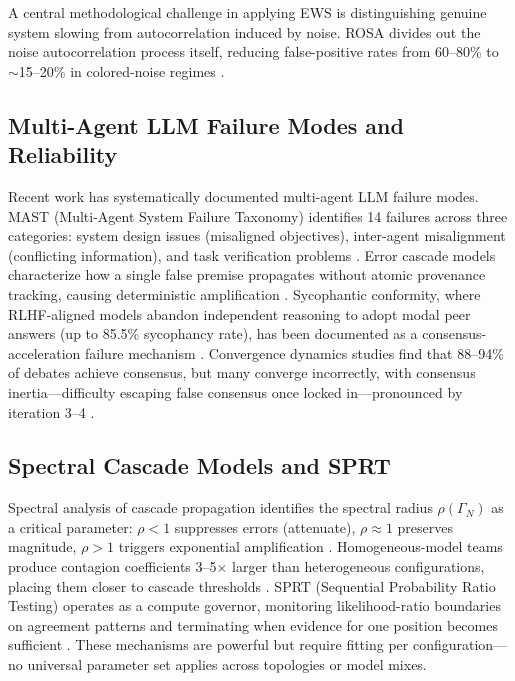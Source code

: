 \documentclass[11pt,letterpaper]{article}
\begin{document}
A central methodological challenge in applying EWS is distinguishing genuine system slowing from autocorrelation induced by noise. ROSA divides out the noise autocorrelation process itself, reducing false-positive rates from 60--80\% to $\sim$15--20\% in colored-noise regimes \citep{Clarke2023}.

\subsection{Multi-Agent LLM Failure Modes and Reliability}

Recent work has systematically documented multi-agent LLM failure modes. MAST (Multi-Agent System Failure Taxonomy) identifies 14 failures across three categories: system design issues (misaligned objectives), inter-agent misalignment (conflicting information), and task verification problems \citep{Cemri2025}. Error cascade models characterize how a single false premise propagates without atomic provenance tracking, causing deterministic amplification \citep{Xie2026}. Sycophantic conformity, where RLHF-aligned models abandon independent reasoning to adopt modal peer answers (up to 85.5\% sycophancy rate), has been documented as a consensus-acceleration failure mechanism \citep{Wynn2025}. Convergence dynamics studies find that 88--94\% of debates achieve consensus, but many converge incorrectly, with consensus inertia---difficulty escaping false consensus once locked in---pronounced by iteration 3--4 \citep{Wu2025,Marandi2026}.

\subsection{Spectral Cascade Models and SPRT}

Spectral analysis of cascade propagation identifies the spectral radius $\rho(\Gamma_N)$ as a critical parameter: $\rho < 1$ suppresses errors (attenuate), $\rho \approx 1$ preserves magnitude, $\rho > 1$ triggers exponential amplification \citep{Liu2026}. Homogeneous-model teams produce contagion coefficients 3--5$\times$ larger than heterogeneous configurations, placing them closer to cascade thresholds \citep{Liu2026}. SPRT (Sequential Probability Ratio Testing) operates as a compute governor, monitoring likelihood-ratio boundaries on agreement patterns and terminating when evidence for one position becomes sufficient \citep{Morandi2026}. These mechanisms are powerful but require fitting per configuration---no universal parameter set applies across topologies or model mixes.
\end{document}
